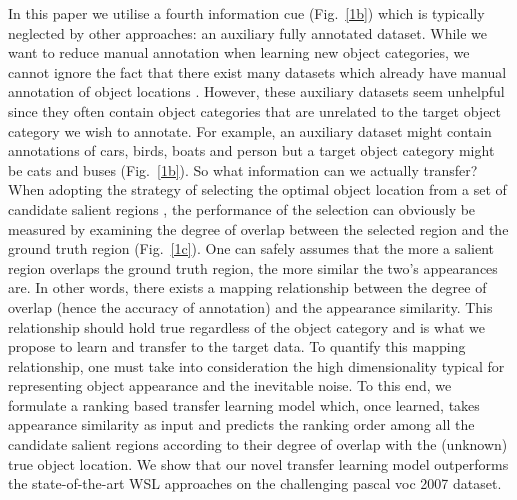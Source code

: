 \documentclass{bmvc2k}
\def\pascal07{{\sc pascal voc} 2007}
\begin{document}
In this paper we utilise a fourth information cue (Fig.~\ref{1b}) which is typically neglected by other approaches: an auxiliary fully annotated dataset. While we want to reduce manual annotation when learning new object categories, we cannot ignore the fact that there exist many datasets which already have manual annotation of object locations \cite{pascalvoc2007}. However, these auxiliary datasets seem unhelpful since they often contain object categories that are unrelated to the target object category we wish to annotate. For example, an auxiliary dataset might contain annotations of cars, birds, boats and person but a target object category might be cats and buses (Fig.~\ref{1b}). So what information can we actually transfer? When adopting the strategy of selecting the optimal object location from a set of candidate salient regions \cite{Deselaerslocalizing2010,Sivaiccv2011}, the performance of the selection can obviously be measured by examining the degree of overlap between the selected region and the ground truth region (Fig.~\ref{1c}). One can safely assumes that the more a salient region overlaps the ground truth region, the more similar the two's appearances are. In other words, there exists a mapping relationship between the degree of overlap (hence the accuracy of annotation) and the appearance similarity. This relationship should hold true regardless of the object category  and is what we propose to learn and transfer to the target data. To quantify this mapping relationship, one must take into consideration the high dimensionality typical for representing object appearance and the inevitable noise. To this end, we formulate a ranking based transfer learning model which, once learned,  takes appearance similarity as input and predicts the ranking order among all the candidate salient regions according to their degree of overlap with the (unknown) true object location.   We show that our novel transfer learning model outperforms the state-of-the-art WSL approaches on the challenging \pascal07 dataset. 

\end{document}

